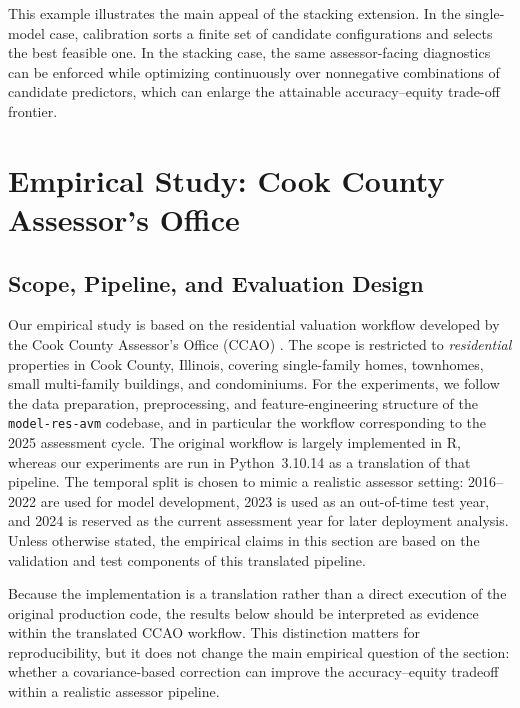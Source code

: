 \documentclass[12pt, draft]{article}
\theoremstyle{plain}
\theoremstyle{definition}
\newcommand{\1}{\mathbf{1}}
\begin{document}
This example illustrates the main appeal of the stacking extension. In the single-model case, calibration sorts a finite set of candidate configurations and selects the best feasible one. In the stacking case, the same assessor-facing diagnostics can be enforced while optimizing continuously over nonnegative combinations of candidate predictors, which can enlarge the attainable accuracy--equity trade-off frontier.






\section{Empirical Study: Cook County Assessor's Office}
\label{sec:empirical}

\subsection{Scope, Pipeline, and Evaluation Design}

Our empirical study is based on the residential valuation workflow developed by the Cook County Assessor's Office (CCAO) \cite{ccao_data_2026}. The scope is restricted to \emph{residential} properties in Cook County, Illinois, covering single-family homes, townhomes, small multi-family buildings, and condominiums. For the experiments, we follow the data preparation, preprocessing, and feature-engineering structure of the \texttt{model-res-avm} codebase, and in particular the workflow corresponding to the 2025 assessment cycle. The original workflow is largely implemented in R, whereas our experiments are run in Python~3.10.14 as a translation of that pipeline. The temporal split is chosen to mimic a realistic assessor setting: 2016--2022 are used for model development, 2023 is used as an out-of-time test year, and 2024 is reserved as the current assessment year for later deployment analysis. Unless otherwise stated, the empirical claims in this section are based on the validation and test components of this translated pipeline.

Because the implementation is a translation rather than a direct execution of the original production code, the results below should be interpreted as evidence within the translated CCAO workflow. This distinction matters for reproducibility, but it does not change the main empirical question of the section: whether a covariance-based correction can improve the accuracy--equity tradeoff within a realistic assessor pipeline.
\end{document}
